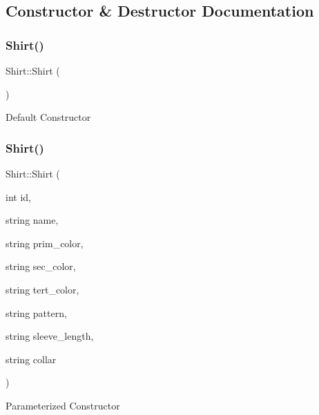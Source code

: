 \subsection{Constructor \& Destructor Documentation}
\mbox{\label{classShirt_a38664a136cdc92583d8c13a8281905d5}} 
\subsubsection{\texorpdfstring{Shirt()}{Shirt()}\hspace{0.1cm}{\footnotesize\ttfamily [1/2]}}
{\footnotesize\ttfamily Shirt\+::\+Shirt (\begin{DoxyParamCaption}{ }\end{DoxyParamCaption})}

Default Constructor \mbox{\label{classShirt_a5df3975569b7f5874a905d31e4056b7b}} 
\subsubsection{\texorpdfstring{Shirt()}{Shirt()}\hspace{0.1cm}{\footnotesize\ttfamily [2/2]}}
{\footnotesize\ttfamily Shirt\+::\+Shirt (\begin{DoxyParamCaption}\item[{int}]{id,  }\item[{string}]{name,  }\item[{string}]{prim\+\_\+color,  }\item[{string}]{sec\+\_\+color,  }\item[{string}]{tert\+\_\+color,  }\item[{string}]{pattern,  }\item[{string}]{sleeve\+\_\+length,  }\item[{string}]{collar }\end{DoxyParamCaption})}

Parameterized Constructor


